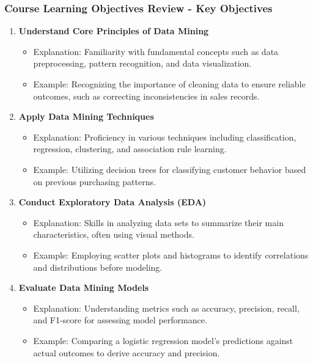 \documentclass[aspectratio=169]{beamer}
\begin{document}
\begin{frame}[fragile]
    \frametitle{Course Learning Objectives Review - Key Objectives}
    \begin{enumerate}
        \item \textbf{Understand Core Principles of Data Mining}
            \begin{itemize}
                \item Explanation: Familiarity with fundamental concepts such as data preprocessing, pattern recognition, and data visualization.
                \item Example: Recognizing the importance of cleaning data to ensure reliable outcomes, such as correcting inconsistencies in sales records.
            \end{itemize}

        \item \textbf{Apply Data Mining Techniques}
            \begin{itemize}
                \item Explanation: Proficiency in various techniques including classification, regression, clustering, and association rule learning.
                \item Example: Utilizing decision trees for classifying customer behavior based on previous purchasing patterns.
            \end{itemize}

        \item \textbf{Conduct Exploratory Data Analysis (EDA)}
            \begin{itemize}
                \item Explanation: Skills in analyzing data sets to summarize their main characteristics, often using visual methods.
                \item Example: Employing scatter plots and histograms to identify correlations and distributions before modeling.
            \end{itemize}

        \item \textbf{Evaluate Data Mining Models}
            \begin{itemize}
                \item Explanation: Understanding metrics such as accuracy, precision, recall, and F1-score for assessing model performance.
                \item Example: Comparing a logistic regression model's predictions against actual outcomes to derive accuracy and precision.
            \end{itemize}


\end{enumerate}
\end{frame}
\end{document}
